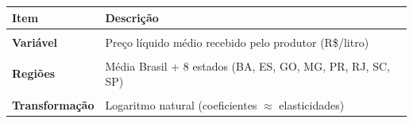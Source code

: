 \begin{quadro}[!h]
\centering
\caption{\label{quad:fonte}Fonte e variáveis.}
\centering
\fontsize{10}{12}\selectfont
\begin{tabular}[t]{>{\raggedright\arraybackslash}p{4cm}>{\raggedright\arraybackslash}p{11cm}}
\toprule
Item & Descrição\\
\midrule
\textbf{\cellcolor{gray!10}{Fonte}} & \cellcolor{gray!10}{CEPEA/ESALQ-USP --- Indicador do preço do leite ao produtor}\\
\textbf{Variável} & Preço líquido médio recebido pelo produtor (R\$/litro)\\
\textbf{\cellcolor{gray!10}{Frequência / Período}} & \cellcolor{gray!10}{Mensal --- jan/2016 a abr/2026 (124 observações)}\\
\textbf{Regiões} & Média Brasil + 8 estados (BA, ES, GO, MG, PR, RJ, SC, SP)\\
\textbf{\cellcolor{gray!10}{Deflator}} & \cellcolor{gray!10}{IPCA --- número-índice (IBGE, via API do IPEA); preços reais}\\
\textbf{Transformação} & Logaritmo natural (coeficientes $\approx$ elasticidades)\\
\bottomrule
\end{tabular}
\end{quadro}
